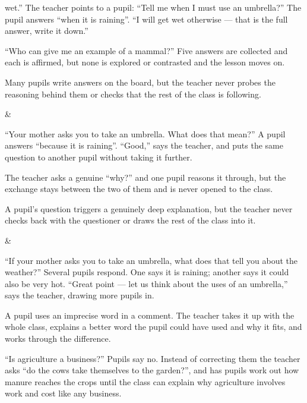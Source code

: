 \documentclass[10pt,a4paper]{article}
\newcommand{\exlistsize}{\scriptsize}
\begin{document}
{\begin{exlist}
        wet.'' The teacher points to a pupil: ``Tell me when I must use an umbrella?'' The pupil answers
        ``when it is raining''. ``I will get wet otherwise --- that is the full answer, write it down.''
  \item ``Who can give me an example of a mammal?'' Five answers are collected and each is affirmed, but
        none is explored or contrasted and the lesson moves on.
  \item Many pupils write answers on the board, but the teacher never probes the reasoning behind
        them or checks that the rest of the class is following.
\end{exlist} &
\exlistsize\begin{exlist}
  \item ``Your mother asks you to take an umbrella. What does that mean?'' A pupil answers ``because it is
        raining''. ``Good,'' says the teacher, and puts the same question to another pupil without taking
        it further.
  \item The teacher asks a genuine ``why?'' and one pupil reasons it through, but the exchange stays between
        the two of them and is never opened to the class.
  \item A pupil's question triggers a genuinely deep explanation, but the teacher never checks back with the
        questioner or draws the rest of the class into it.
\end{exlist} &
\exlistsize\begin{exlist}
  \item ``If your mother asks you to take an umbrella, what does that tell you about the weather?''
        Several pupils respond. One says it is raining; another says it could also be very hot. ``Great
        point --- let us think about the uses of an umbrella,'' says the teacher, drawing more pupils in.
  \item A pupil uses an imprecise word in a comment. The teacher takes it up with the whole class, explains
        a better word the pupil could have used and why it fits, and works through the difference.
  \item ``Is agriculture a business?'' Pupils say no. Instead of correcting them the teacher asks ``do the
        cows take themselves to the garden?'', and has pupils work out how manure reaches the crops until
        the class can explain why agriculture involves work and cost like any business.
\end{exlist}
}
 
\end{document}
